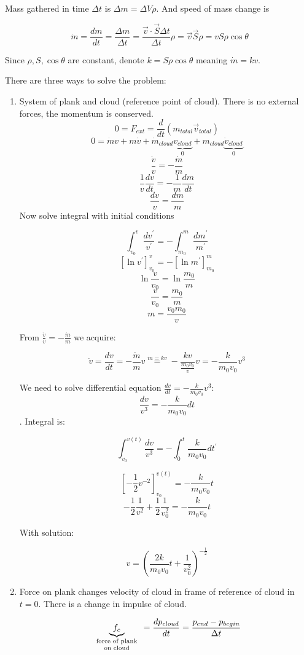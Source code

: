 Mass gathered in time $\Delta t$ is $\Delta m = \Delta V \rho$. And speed of mass change is

$$\dot{m} = \frac{dm}{dt} = \frac{\Delta m}{\Delta t}= \frac{\vec{v} \cdot \vec{S} \Delta t}{\Delta t} \rho= \vec{v}\vec{S}\rho = vS\rho \cos \theta$$

Since $\rho, S, \cos \theta$ are constant, denote $k = S \rho \cos \theta$ meaning $\dot{m} = kv$.


There are three ways to solve the problem:
\begin{enumerate}
	\item System of plank and cloud  (reference point of cloud). There is no external forces, the momentum is conserved. 
	$$0  = F_{ext} = \frac{d}{dt} \left( m_{total} \vec{v}_{total} \right)$$
	$$0 = \dot{m}v + m\dot{v} + \dot{m}_{cloud} \underbrace{v_{cloud}}_{0} + m_{cloud}\underbrace{\dot{v}_{cloud}}_{0}$$
	$$\frac{\dot{v}}{v}= - \frac{\dot{m}}{m}$$
	$$\frac{1}{v} \frac{dv}{dt} = - \frac{1}{m} \frac{dm}{dt}$$
	$$\frac{dv}{v}=\frac{dm}{m}$$
	Now solve integral with initial conditions
	
	$$\int_{v_0}^{v} \frac{d v^\prime}{v^\prime} = - \int_{m_0}^{m} \frac{d m^\prime}{m^\prime} $$
	$$\left[ \ln v^\prime \right]^v_{v_0} = - \left[ \ln m^\prime \right]^m_{m_0}   $$
	$$\ln \frac{v}{v_0} = \ln \frac{m_0}{m} $$
	$$ \frac{v}{v_0} = \frac{m_0}{m} $$
	$$ m = \frac{v_0m_0}{v} $$
	
	From $\frac{\dot{v}}{v}= - \frac{\dot{m}}{m}$ we acquire:
	
	$$\dot{v} = \frac{dv}{dt} = -\frac{\dot{m}}{m}v \stackrel{\dot{m} = kv}{=} -\frac{kv}{\frac{m_0v_0}{v}}v  = -\frac{k}{m_0v_0}v^3$$
	
	We need to solve differential equation $\frac{dv}{dt} = -\frac{k}{m_0v_0}v^3$:
	$$\frac{dv}{v^3} = - \frac{k}{m_0v_0} dt$$.
	Integral is:
	
	$$ \int_{v_0}^{v(t)} \frac{dv}{v^3} = -\int_{0}^{t} \frac{k}{m_0v_0} dt^\prime $$
	
	$$\left[ -\frac{1}{2} v^{-2}\right]^{v(t)}_{v_0} = -\frac{k}{m_0v_0}t$$
	$$-\frac{1}{2} \frac{1}{v^2} + \frac{1}{2}\frac{1}{v_0^2} = -\frac{k}{m_0v_0}t$$
	
	With solution:
	
	$$v = \left( \frac{2k}{m_0v_0}t + \frac{1}{v_0^2} \right)^{-\frac{1}{2}}$$
	\item Force on plank changes velocity of cloud in frame of reference  of cloud in $t=0$. There is a change in impulse of cloud.
	
	$$\underbrace{f_c}_{\parbox{2cm}{\centering \scriptsize force of plank on cloud}} = \frac{dp_{cloud}}{dt} = \frac{p_{end}-p_{begin}}{\Delta t}$$
	

\end{enumerate}
